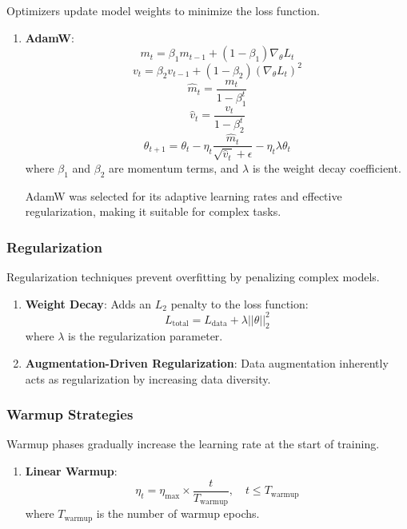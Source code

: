 \documentclass[conference]{IEEEtran}
\begin{document}
Optimizers update model weights to minimize the loss function.

\begin{enumerate}
    \item \textbf{AdamW}:
    \[
    m_t = \beta_1 m_{t-1} + (1 - \beta_1) \nabla_\theta L_t
    \]
    \[
    v_t = \beta_2 v_{t-1} + (1 - \beta_2) (\nabla_\theta L_t)^2
    \]
    \[
    \hat{m}_t = \frac{m_t}{1 - \beta_1^t}
    \]
    \[
    \hat{v}_t = \frac{v_t}{1 - \beta_2^t}
    \]
    \[
    \theta_{t+1} = \theta_t - \eta_t \frac{\hat{m}_t}{\sqrt{\hat{v}_t} + \epsilon} - \eta_t \lambda \theta_t
    \]
    where \( \beta_1 \) and \( \beta_2 \) are momentum terms, and \( \lambda \) is the weight decay coefficient.

    AdamW was selected for its adaptive learning rates and effective regularization, making it suitable for complex tasks.
\end{enumerate}

\subsubsection{Regularization}

Regularization techniques prevent overfitting by penalizing complex models.

\begin{enumerate}
    \item \textbf{Weight Decay}:
    Adds an \( L_2 \) penalty to the loss function:
    \[
    L_{\text{total}} = L_{\text{data}} + \lambda ||\theta||_2^2
    \]
    where \( \lambda \) is the regularization parameter.

    \item \textbf{Augmentation-Driven Regularization}:
    Data augmentation inherently acts as regularization by increasing data diversity.
\end{enumerate}

\subsubsection{Warmup Strategies}

Warmup phases gradually increase the learning rate at the start of training.

\begin{enumerate}
    \item \textbf{Linear Warmup}:
    \[
    \eta_t = \eta_{\text{max}} \times \frac{t}{T_{\text{warmup}}}, \quad t \leq T_{\text{warmup}}
    \]
    where \( T_{\text{warmup}} \) is the number of warmup epochs.
\end{enumerate}
\end{document}
